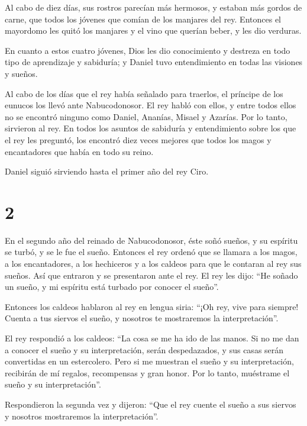  Al cabo de diez días, sus rostros parecían más hermosos,
y estaban más gordos de carne, que todos los jóvenes que comían de los
manjares del rey.  Entonces el mayordomo les quitó los
manjares y el vino que querían beber, y les dio verduras.

 En cuanto a estos cuatro jóvenes, Dios les dio
conocimiento y destreza en todo tipo de aprendizaje y sabiduría; y
Daniel tuvo entendimiento en todas las visiones y sueños.

 Al cabo de los días que el rey había señalado para
traerlos, el príncipe de los eunucos los llevó ante Nabucodonosor.
 El rey habló con ellos, y entre todos ellos no se
encontró ninguno como Daniel, Ananías, Misael y Azarías. Por lo tanto,
sirvieron al rey.  En todos los asuntos de sabiduría y
entendimiento sobre los que el rey les preguntó, los encontró diez veces
mejores que todos los magos y encantadores que había en todo su reino.

 Daniel siguió sirviendo hasta el primer año del rey
Ciro.

\hypertarget{section-1}{%
\section{2}\label{section-1}}

 En el segundo año del reinado de Nabucodonosor, éste soñó
sueños, y su espíritu se turbó, y se le fue el sueño. 
Entonces el rey ordenó que se llamara a los magos, a los encantadores, a
los hechiceros y a los caldeos para que le contaran al rey sus sueños.
Así que entraron y se presentaron ante el rey.  El rey les
dijo: ``He soñado un sueño, y mi espíritu está turbado por conocer el
sueño''.

 Entonces los caldeos hablaron al rey en lengua siria:
``¡Oh rey, vive para siempre! Cuenta a tus siervos el sueño, y nosotros
te mostraremos la interpretación''.

 El rey respondió a los caldeos: ``La cosa se me ha ido de
las manos. Si no me dan a conocer el sueño y su interpretación, serán
despedazados, y sus casas serán convertidas en un estercolero.
 Pero si me muestran el sueño y su interpretación,
recibirán de mí regalos, recompensas y gran honor. Por lo tanto,
muéstrame el sueño y su interpretación''.

 Respondieron la segunda vez y dijeron: ``Que el rey
cuente el sueño a sus siervos y nosotros mostraremos la
interpretación''.

